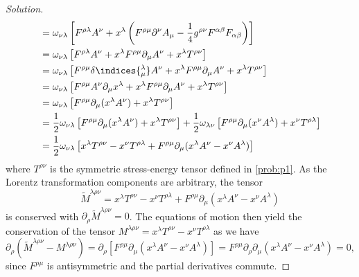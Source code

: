 \begin{proof}[Solution]
\begin{align*}
      &= \omega_{\nu \lambda}\left[F^{\rho \lambda} A^\nu + x^\lambda \left(F^{\rho \mu} \partial^\nu A_\mu - \frac14 g^{\rho \nu} F^{\alpha \beta} F_{\alpha \beta}\right)\right]\\
      &= \omega_{\nu \lambda} \left[F^{\rho \lambda} A^\nu + x^\lambda F^{\rho \mu} \partial_\mu A^\nu + x^\lambda T^{\rho \nu}\right]\\
      &= \omega_{\nu \lambda} \left[F^{\rho \mu} \delta\indices{^\lambda_\mu} A^\nu + x^\lambda F^{\rho \mu} \partial_\mu A^\nu + x^\lambda T^{\rho \nu}\right]\\
      &= \omega_{\nu \lambda} \left[F^{\rho \mu} A^\nu \partial_\mu x^\lambda + x^\lambda F^{\rho \mu} \partial_\mu A^\nu + x^\lambda T^{\rho \nu}\right]\\
      &= \omega_{\nu \lambda} \left[F^{\rho \mu} \partial_\mu( x^\lambda A^\nu) + x^\lambda T^{\rho \nu}\right]\\
      &= \frac12 \omega_{\nu \lambda} \left[F^{\rho \mu} \partial_\mu( x^\lambda A^\nu) + x^\lambda T^{\rho \nu}\right] + \frac12 \omega_{\lambda \nu}\left[F^{\rho \mu} \partial_\mu( x^\nu A^\lambda) + x^\nu T^{\rho \lambda}\right]\\
      &= \frac12 \omega_{\nu \lambda} \left[x^{\lambda} T^{\rho \nu} - x^\nu T^{\rho \lambda} + F^{\rho \mu} \partial_\mu (x^\lambda A^\nu - x^\nu A^{\lambda})\right] 
   \end{align*}
   where \(T^{\rho\nu}\) is the symmetric stress-energy tensor defined in \cref{prob:p1}. As the Lorentz transformation components are arbitrary, the tensor
   \begin{equation*}
      \tilde{M}^{\lambda \rho \nu} = x^{\lambda} T^{\rho \nu} - x^\nu T^{\rho \lambda} + F^{\rho \mu} \partial_\mu(x^\lambda A^\nu - x^\nu A^\lambda)
   \end{equation*}
   is conserved with \(\partial_\rho \tilde{M}^{\lambda \rho \nu} = 0\). The equations of motion then yield the conservation of the tensor \(M^{\lambda \rho \nu} = x^{\lambda}T^{\rho \nu} - x^{\nu}T^{\rho \lambda}\) as we have
   \begin{equation*}
      \partial_\rho (\tilde{M}^{\lambda \rho \nu} - M^{\lambda \rho \nu}) = \partial_\rho \left[F^{\rho \mu} \partial_\mu(x^\lambda A^\nu - x^\nu A^\lambda)\right]  = F^{\rho \mu} \partial_\rho \partial_\mu (x^\lambda A^\nu - x^\nu A^\lambda) = 0,
   \end{equation*}
   since \(F^{\rho \mu}\) is antisymmetric and the partial derivatives commute.
\end{proof}
